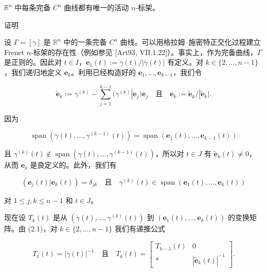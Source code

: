 \begin{theorem}

$ \mathbb{R}^n $ 中每条完备 $ C^n $ 曲线都有唯一的活动 $ n $-标架。

证明

\begin{subitems}
\item

设 $ \Gamma = [\gamma] $ 是 $ \mathbb{R}^n $ 中的一条完备 $ C^n $ 曲线。可以用格拉姆–施密特正交化过程建立 Frenet $ n $-标架的存在性（例如参见 [Art93, VII.1.22]）。事实上，作为完备曲线，$ \Gamma $ 是正则的。因此对 $ t \in I $，$ \mathbf{e}_1(t) := \dot\gamma(t)/|\dot\gamma(t)| $ 有定义。对 $ k \in \{2, \ldots, n - 1\} $，我们递归地定义 $ \mathbf{e}_k $。利用已经构造好的 $ \mathbf{e}_1, \ldots, \mathbf{e}_{k-1} $，我们令

\begin{equation}
\widetilde{\mathbf{e}}_k := \gamma^{(k)} - \sum_{j=1}^{k-1}(\gamma^{(k)}|\mathbf{e}_j)\mathbf{e}_j \quad \text{且} \quad \mathbf{e}_k := \widetilde{\mathbf{e}}_k/|\widetilde{\mathbf{e}}_k| .\tag{2.1}
\end{equation}

因为

\begin{equation}
\operatorname{span}(\dot\gamma(t), \ldots, \gamma^{(k-1)}(t)) = \operatorname{span}(\mathbf{e}_1(t), \ldots, \mathbf{e}_{k-1}(t))\tag{2.2}
\end{equation}

且 $ \gamma^{(k)}(t) \notin \operatorname{span}(\dot\gamma(t), \ldots, \gamma^{(k-1)}(t)) $，所以对 $ t \in J $ 有 $ \widetilde{\mathbf{e}}_k(t) \ne 0 $，从而 $ \mathbf{e}_k $ 是良定义的。此外，我们有

\begin{equation}
(\mathbf{e}_j(t)|\mathbf{e}_k(t)) = \delta_{jk} \quad \text{且} \quad \gamma^{(k)}(t) \in \operatorname{span}(\mathbf{e}_1(t), \ldots, \mathbf{e}_k(t))\tag{2.3}
\end{equation}

对 $ 1 \le j, k \le n - 1 $ 和 $ t \in J $。

\item

现在设 $ T_k(t) $ 是从 $ (\dot\gamma(t), \ldots, \gamma^{(k)}(t)) $ 到 $ (\mathbf{e}_1(t), \ldots, \mathbf{e}_k(t)) $ 的变换矩阵。由 (2.1)，对 $ k \in \{2, \ldots, n - 1\} $ 我们有递推公式

\begin{equation*}
T_1(t) = |\dot\gamma(t)|^{-1} \quad \text{且} \quad T_k(t) = \begin{bmatrix} T_{k-1}(t) & 0 \\ * & |\widetilde{\mathbf{e}}_k(t)|^{-1} \end{bmatrix} .
\end{equation*}


\end{subitems}
\end{theorem}
